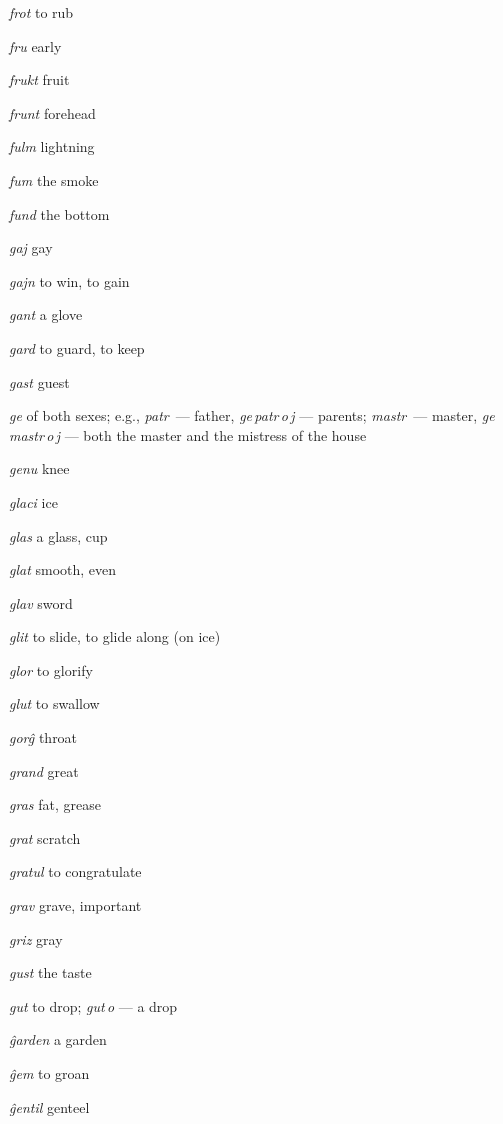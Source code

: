 \begin{landscape}
\begin{multicols}{5}
\begin{outdent}{1em}
\emph{frot}  to rub

\emph{fru } early

\emph{frukt}  fruit

\emph{frunt}  forehead

\emph{fulm}  lightning

\emph{fum}  the smoke

\emph{fund } the bottom
\end{outdent}


\begin{outdent}{1em}
\emph{gaj  }gay

\emph{gajn}  to win, to gain

\emph{gant}  a glove

\emph{gard } to guard, to keep

\emph{gast}  guest

\emph{ge}  of both sexes; e.g., \emph{patr\,} — father, \emph{ge\,patr\,o\,j} — parents; \emph{mastr\,} — master, \emph{ge\,mastr\,o\,j} — both the master and the mistress of the house

\emph{genu}  knee

\emph{glaci}  ice

\emph{glas}  a glass, cup

\emph{glat}  smooth, even

\emph{glav}  sword

\emph{glit}  to slide, to glide along (on ice)

\emph{glor}  to glorify

\emph{glut}  to swallow

\emph{gorĝ } throat

\emph{grand}  great

\emph{gras } fat, grease

\emph{grat}  scratch

\emph{gratul}  to congratulate

\emph{grav } grave, important

\emph{griz}  gray

\emph{gust } the taste

\emph{gut } to drop; \emph{gut\,o} — a drop
\end{outdent}


\begin{outdent}{1em}
\emph{ĝarden  }a garden

\emph{ĝem}  to groan

\emph{ĝentil}  genteel


\end{outdent}
\end{multicols}
\end{landscape}

